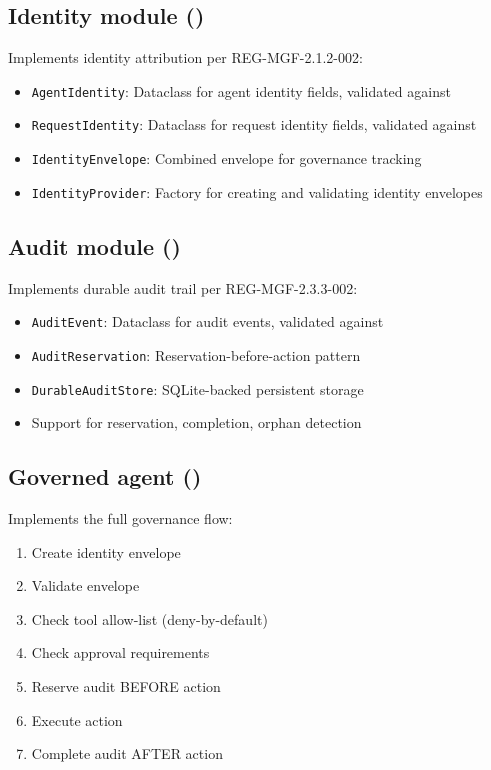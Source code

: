 \subsection{Identity module ()}

Implements identity attribution per REG-MGF-2.1.2-002:

\begin{itemize}
  \item \texttt{AgentIdentity}: Dataclass for agent identity fields, validated
        against 
  \item \texttt{RequestIdentity}: Dataclass for request identity fields, validated
        against 
  \item \texttt{IdentityEnvelope}: Combined envelope for governance tracking
  \item \texttt{IdentityProvider}: Factory for creating and validating identity
        envelopes
\end{itemize}

\subsection{Audit module ()}

Implements durable audit trail per REG-MGF-2.3.3-002:

\begin{itemize}
  \item \texttt{AuditEvent}: Dataclass for audit events, validated against
  \item \texttt{AuditReservation}: Reservation-before-action pattern
  \item \texttt{DurableAuditStore}: SQLite-backed persistent storage
  \item Support for reservation, completion, orphan detection
\end{itemize}

\subsection{Governed agent ()}

Implements the full governance flow:

\begin{enumerate}
  \item Create identity envelope
  \item Validate envelope
  \item Check tool allow-list (deny-by-default)
  \item Check approval requirements
  \item Reserve audit BEFORE action
  \item Execute action
  \item Complete audit AFTER action
\end{enumerate}

